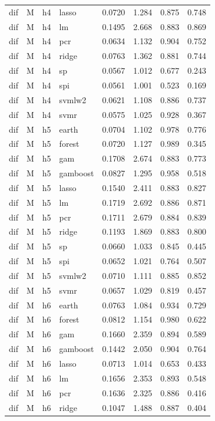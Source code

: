 \begin{ThreePartTable}
\begin{longtable}[t]{llclcccc}
dif & M & h4 & lasso & 0.0720 & 1.284 & 0.875 & 0.748\\
dif & M & h4 & lm & 0.1495 & 2.668 & 0.883 & 0.869\\
dif & M & h4 & pcr & 0.0634 & 1.132 & 0.904 & 0.752\\
dif & M & h4 & ridge & 0.0763 & 1.362 & 0.881 & 0.744\\
dif & M & h4 & sp & 0.0567 & 1.012 & 0.677 & 0.243\\
dif & M & h4 & spi & 0.0561 & 1.001 & 0.523 & 0.169\\
dif & M & h4 & svmlw2 & 0.0621 & 1.108 & 0.886 & 0.737\\
dif & M & h4 & svmr & 0.0575 & 1.025 & 0.928 & 0.367\\
\addlinespace
dif & M & h5 & earth & 0.0704 & 1.102 & 0.978 & 0.776\\
dif & M & h5 & forest & 0.0720 & 1.127 & 0.989 & 0.345\\
dif & M & h5 & gam & 0.1708 & 2.674 & 0.883 & 0.773\\
dif & M & h5 & gamboost & 0.0827 & 1.295 & 0.958 & 0.518\\
dif & M & h5 & lasso & 0.1540 & 2.411 & 0.883 & 0.827\\
dif & M & h5 & lm & 0.1719 & 2.692 & 0.886 & 0.871\\
dif & M & h5 & pcr & 0.1711 & 2.679 & 0.884 & 0.839\\
dif & M & h5 & ridge & 0.1193 & 1.869 & 0.883 & 0.800\\
dif & M & h5 & sp & 0.0660 & 1.033 & 0.845 & 0.445\\
dif & M & h5 & spi & 0.0652 & 1.021 & 0.764 & 0.507\\
dif & M & h5 & svmlw2 & 0.0710 & 1.111 & 0.885 & 0.852\\
dif & M & h5 & svmr & 0.0657 & 1.029 & 0.819 & 0.457\\
\addlinespace
dif & M & h6 & earth & 0.0763 & 1.084 & 0.934 & 0.729\\
dif & M & h6 & forest & 0.0812 & 1.154 & 0.980 & 0.622\\
dif & M & h6 & gam & 0.1660 & 2.359 & 0.894 & 0.589\\
dif & M & h6 & gamboost & 0.1442 & 2.050 & 0.904 & 0.764\\
dif & M & h6 & lasso & 0.0713 & 1.014 & 0.653 & 0.433\\
dif & M & h6 & lm & 0.1656 & 2.353 & 0.893 & 0.548\\
dif & M & h6 & pcr & 0.1636 & 2.325 & 0.886 & 0.416\\
dif & M & h6 & ridge & 0.1047 & 1.488 & 0.887 & 0.404\\

\end{longtable}
\end{ThreePartTable}
